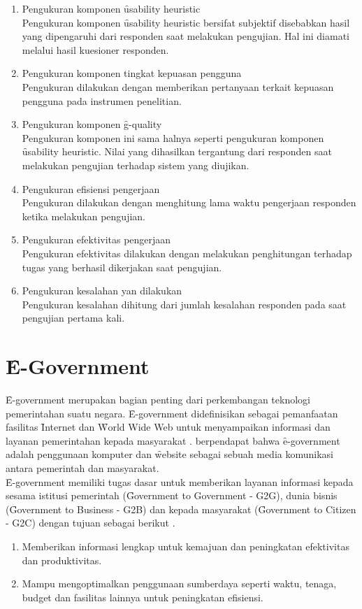 \begin{enumerate}
	\item Pengukuran komponen \f{usability heuristic}\\
	Pengukuran komponen \f{usability heuristic} bersifat subjektif disebabkan hasil yang dipengaruhi dari responden saat melakukan pengujian. Hal ini diamati melalui hasil kuesioner responden.
	\item Pengukuran komponen tingkat kepuasan pengguna\\
	Pengukuran dilakukan dengan memberikan pertanyaan terkait kepuasan pengguna pada instrumen penelitian.
	\item Pengukuran komponen \f{g-quality}\\
	Pengukuran komponen ini sama halnya seperti pengukuran komponen \f{usability heuristic}. Nilai yang dihasilkan tergantung dari responden saat melakukan pengujian terhadap sistem yang diujikan.
	\item Pengukuran efisiensi pengerjaan\\
	Pengukuran dilakukan dengan menghitung lama waktu pengerjaan responden ketika melakukan pengujian.  
	\item Pengukuran efektivitas pengerjaan\\
	Pengukuran efektivitas dilakukan dengan melakukan penghitungan terhadap tugas yang berhasil dikerjakan saat pengujian.
	\item Pengukuran kesalahan yan dilakukan\\
	Pengukuran kesalahan dihitung dari jumlah kesalahan responden pada saat pengujian pertama kali.
\end{enumerate}

\section{\f{E-Government}}
\f{E-government} merupakan bagian penting dari perkembangan teknologi pemerintahan suatu negara. \f{E-government} didefinisikan sebagai pemanfaatan fasilitas \f{Internet} dan \f{World Wide Web} untuk menyampaikan informasi dan layanan pemerintahan kepada masyarakat \citep{buku.un}. \citet{paper.yen} berpendapat bahwa \f{e-government} adalah penggunaan komputer dan \f{website} sebagai sebuah media komunikasi antara pemerintah dan masyarakat.
\newline\\
\f{E-government} memiliki tugas dasar untuk memberikan layanan informasi kepada sesama istitusi pemerintah (\f{Government to Government} - G2G), dunia bisnis (\f{Government to Business} - G2B) dan kepada masyarakat (\f{Government to Citizen} - G2C) dengan tujuan sebagai berikut \citep{buku.hasibua}.
\begin{enumerate}
	\item Memberikan informasi lengkap untuk kemajuan dan peningkatan efektivitas dan produktivitas.
	\item Mampu mengoptimalkan penggunaan sumberdaya seperti waktu, tenaga, budget dan fasilitas lainnya untuk peningkatan efisiensi.
\end{enumerate}

